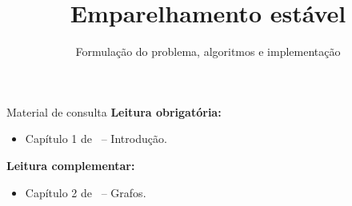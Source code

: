 \newcommand{\templatesdir}{../../../templates}
\newcommand{\template}{template-slides-est}


\title[Emparalhamento estável]{Emparelhamento estável}
\subtitle{Formulação do problema, algoritmos e implementação}



\maketitle

\begin{frame}{Material de consulta}
	\textbf{Leitura obrigatória:}
	\begin{itemize}
		\item Capítulo 1 de~\cite{KleinbergAndTardos2006} -- Introdução.
	\end{itemize}
	
	\bigskip
	
	\textbf{Leitura complementar:}
	\begin{itemize}
		\item Capítulo 2 de~\cite{KleinbergAndTardos2006} -- Grafos.
	\end{itemize}
\end{frame}


